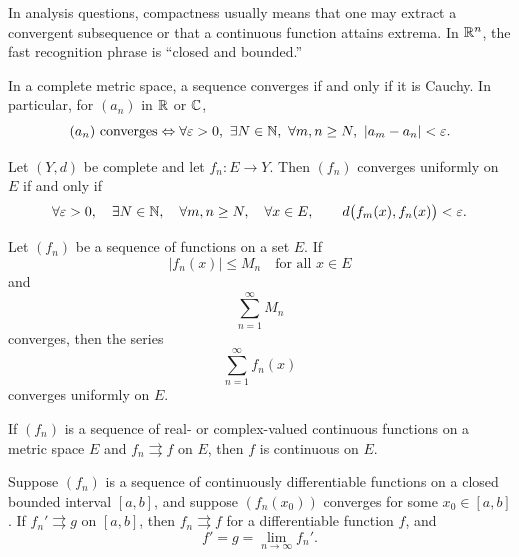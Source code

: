     \begin{strategy}
        In analysis questions, compactness usually means that one may extract a
        convergent subsequence or that a continuous function attains extrema.
        In $\mathbb{R}^n$, the fast recognition phrase is ``closed and bounded.''
    \end{strategy}

    \begin{theorem}
        In a complete metric space, a sequence converges if and only if it is
        Cauchy. In particular, for $(a_n)$ in $\mathbb{R}$ or $\mathbb{C}$,
        \[
            (a_n)\text{ converges}
            \Leftrightarrow
            \forall\varepsilon>0,
            \ \exists N\in\mathbb{N},
            \ \forall m,n\geq N,
            \ |a_m-a_n|<\varepsilon.
        \]
    \end{theorem}

    \begin{theorem}
        Let $(Y,d)$ be complete and let $f_n\colon E\to Y$. Then $(f_n)$ converges
        uniformly on $E$ if and only if
        \[
            \forall\varepsilon>0,
            \quad
            \exists N\in\mathbb{N},
            \quad
            \forall m,n\geq N,
            \quad
            \forall x\in E,
            \qquad
            d\bigl(f_m(x),f_n(x)\bigr)<\varepsilon.
        \]
    \end{theorem}

    \begin{theorem}
        Let $(f_n)$ be a sequence of functions on a set $E$. If
        \[
            |f_n(x)|\leq M_n
            \quad\text{for all }x\in E
        \]
        and
        \[
            \sum_{n=1}^{\infty}M_n
        \]
        converges, then the series
        \[
            \sum_{n=1}^{\infty} f_n(x)
        \]
        converges uniformly on $E$.
    \end{theorem}

    \begin{theorem}
        If $(f_n)$ is a sequence of real- or complex-valued continuous functions
        on a metric space $E$ and $f_n\rightrightarrows f$ on $E$, then $f$ is continuous
        on $E$.
    \end{theorem}

    \begin{theorem}
        Suppose $(f_n)$ is a sequence of continuously differentiable functions
        on a closed bounded interval $[a,b]$, and suppose $(f_n(x_0))$
        converges for some $x_0\in[a,b]$. If $f_n'\rightrightarrows g$ on
        $[a,b]$, then $f_n\rightrightarrows f$ for a differentiable function
        $f$, and
        \[
            f'=g=\lim\limits_{n\to\infty} f_n'.
        \]
    \end{theorem}

